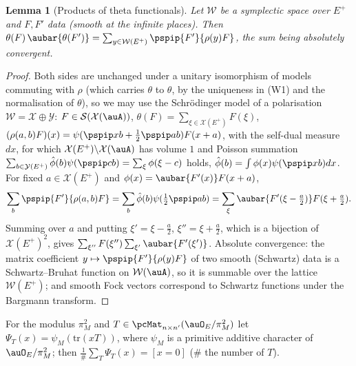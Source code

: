 \documentclass[10pt]{amsart}
\newtheorem{lemma}[theorem]{Lemma}
\theoremstyle{definition}
\theoremstyle{remark}
\begin{document}
\begin{lemma}[Products of theta functionals]\label{psp:prodtheta}
Let $\mathcal W$ be a symplectic space over $E^+$ and $F,F'$ data (smooth at the infinite places).
Then $\theta(F)\,\aubar{\theta(F')}=\sum_{y\in\mathcal W(E^+)}\pspip{F'}{\rho(y)F}$, the sum being
absolutely convergent.
\end{lemma}
\begin{proof}
Both sides are unchanged under a unitary isomorphism of models commuting with $\rho$ (which carries
$\theta$ to $\theta$, by the uniqueness in (W1) and the normalisation of $\theta$), so we may use the
Schrödinger model of a polarisation $\mathcal W=\mathcal X\oplus\mathcal Y$: $F\in\mathcal S(\mathcal
X(\auA))$, $\theta(F)=\sum_{\xi\in\mathcal X(E^+)}F(\xi)$,
$(\rho(a,b)F)(x)=\psi(\pspip xb+\frac12\pspip ab)F(x+a)$, with the self-dual measure $dx$, for which
$\mathcal X(E^+)\backslash\mathcal X(\auA)$ has volume $1$ and Poisson summation
$\sum_{b\in\mathcal Y(E^+)}\hat\phi(b)\psi(\pspip cb)=\sum_\xi\phi(\xi-c)$ holds,
$\hat\phi(b)=\int\phi(x)\psi(\pspip xb)dx$. For fixed $a\in\mathcal X(E^+)$ and
$\phi(x)=\aubar{F'(x)}F(x+a)$,
\[
\sum_{b}\pspip{F'}{\rho(a,b)F}=\sum_b\hat\phi(b)\psi(\tfrac12\pspip ab)=\sum_{\xi}\aubar{F'(\xi-\tfrac a2)}
F(\xi+\tfrac a2).
\]
Summing over $a$ and putting $\xi'=\xi-\frac a2$, $\xi''=\xi+\frac a2$, which is a bijection of
$\mathcal X(E^+)^2$, gives $\sum_{\xi''}F(\xi'')\sum_{\xi'}\aubar{F'(\xi')}$. Absolute convergence: the
matrix coefficient $y\mapsto\pspip{F'}{\rho(y)F}$ of two smooth (Schwartz) data is a Schwartz--Bruhat
function on $\mathcal W(\auA)$, so it is summable over the lattice $\mathcal W(E^+)$; and smooth
Fock vectors correspond to Schwartz functions under the Bargmann transform.
\end{proof}

For the modulus $\pi_M^2$ and $T\in\pcMat_{n\times n'}(\auO_E/\pi_M^2)$ let
$\Psi_T(x)=\psi_{M}(\mathrm{tr}(xT))$, where $\psi_M$ is a primitive additive character of
$\auO_E/\pi_M^2$; then $\frac1{\#}\sum_T\Psi_T(x)=[x=0]$ ($\#$ the number of $T$).
\end{document}
